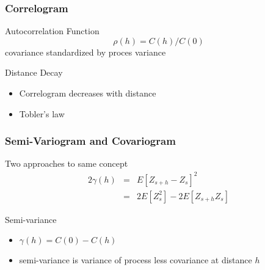 \documentclass[nototal,handout]{beamer}
\begin{document}
  \begin{frame}
    \frametitle{Correlogram}
    \begin{block}{Autocorrelation Function}
      \begin{equation}
	\rho(h) = C(h)/C(0)
	\label{}
      \end{equation}
      covariance standardized by proces variance
     \end{block}
     \begin{block}{ Distance Decay}
       \begin{itemize}
	 \item Correlogram decreases with distance
	 \item Tobler's law
       \end{itemize}
     \end{block}
   \end{frame}
   \begin{frame}
     \frametitle{Semi-Variogram and Covariogram}
     \begin{block}{Two approaches to same concept}
       \begin{eqnarray}
	 2\gamma(h)& =& E[Z_{s+h} - Z_s]^2 \\
	 &=&2 E[Z_s^2] - 2 E[Z_{s+h}Z_s]
       \end{eqnarray}
      \end{block}
      \begin{block}{Semi-variance}
	\begin{itemize}
	  \item $\gamma(h) = C(0) - C(h)$
	  \item semi-variance is variance of process less covariance at
	    distance $h$
	\end{itemize}

      \end{block}
    \end{frame}
\end{document}
